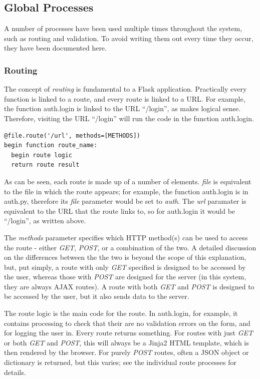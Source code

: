 \documentclass{article}[12pt,a4paper]
\begin{document}
\subsection{Global Processes}
A number of processes have been used multiple times throughout the system, such as routing and validation. To avoid writing them out every time they occur, they have been documented here.

\subsubsection{Routing}
The concept of \textit{routing} is fundamental to a Flask application. Practically every function is linked to a route, and every route is linked to a URL. For example, the function auth.login is linked to the URL ``/login'', as makes logical sense. Therefore, visiting the URL ``/login'' will run the code in the function auth.login. 

\begin{verbatim}
@file.route('/url', methods=[METHODS])
begin function route_name:
  begin route logic
  return route result
\end{verbatim}
As can be seen, each route is made up of a number of elements. \textit{file} is equivalent to the file in which the route appears; for example, the function auth.login is in auth.py, therefore its \textit{file} parameter would be set to \textit{auth}. The \textit{url} paramater is equivalent to the URL that the route links to, so for auth.login it would be ``/login'', as written above.

The \textit{methods} parameter specifies which HTTP method(s) can be used to access the route - either \textit{GET}, \textit{POST}, or a combination of the two. A detailed discussion on the differences between the the two is beyond the scope of this explanation, but, put simply, a route with only \textit{GET} specified is designed to be accessed by the user, whereas those with \textit{POST} are designed for the server (in this system, they are always AJAX routes). A route with both \textit{GET} and \textit{POST} is designed to be accessed by the user, but it also sends data to the server.

The route logic is the main code for the route. In auth.login, for example, it contains processing to check that their are no validation errors on the form, and for logging the user in. Every route returns something. For routes with just \textit{GET} or both \textit{GET} and \textit{POST}, this will always be a Jinja2 HTML template, which is then rendered by the browser. For purely \textit{POST} routes, often a JSON object or dictionary is returned, but this varies; see the individual route processes for details.
\end{document}
